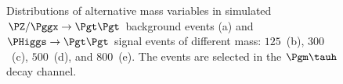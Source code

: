 \begin{figure}
\begin{center}
\end{center}
\caption{
  Distributions of alternative mass variables in simulated $\PZ/\Pggx \to \Pgt\Pgt$ background events (a) 
  and $\PHiggs \to \Pgt\Pgt$ signal events of different mass:
  $125$~\GeV (b), $300$~\GeV (c), $500$~\GeV (d), and $800$~\GeV (e).
  The events are selected in the $\Pgm\tauh$ decay channel.
}
\label{fig:massDistributions_mutau}
\end{figure}

